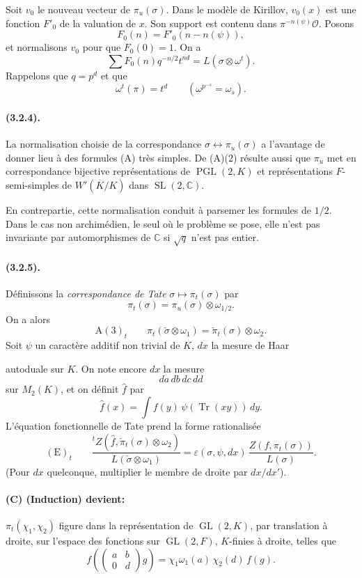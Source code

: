\documentclass[10pt,a4paper]{article}
\providecommand{\GL}{\operatorname{GL}}
\providecommand{\SL}{\operatorname{SL}}
\providecommand{\PGL}{\operatorname{PGL}}
\providecommand{\Tr}{\operatorname{Tr}}
\providecommand{\C}{\mathbb C}
\begin{document}
Soit \(v_0\) le nouveau vecteur de \(\pi_u(\sigma)\). Dans le modèle de Kirillov, \(v_0(x)\) est une fonction \(F'_0\) de la valuation de \(x\). Son support est contenu dans \(\pi^{-n(\psi)}\mathcal O\). Posons
\[
F_0(n)=F'_0(n-n(\psi)),
\]
et normalisons \(v_0\) pour que \(F_0(0)=1\). On a
\[
\sum F_0(n)q^{-n/2}t^{nd}=L(\sigma\otimes\omega^t).
\]
Rappelons que \(q=p^d\) et que
\[
\omega^t(\pi)=t^d\qquad(\omega^{p^{-s}}=\omega_s).
\]

\paragraph{(3.2.4).} La normalisation choisie de la correspondance \(\sigma\longleftrightarrow\pi_u(\sigma)\) a l'avantage de donner lieu à des formules (A) très simples. De (A)(2) résulte aussi que \(\pi_u\) met en correspondance bijective représentations de \(\PGL(2,K)\) et représentations \(F\)-semi-simples de \(W'(\overline K/K)\) dans \(\SL(2,\C)\).

En contrepartie, cette normalisation conduit à parsemer les formules de \(1/2\). Dans le cas non archimédien, le seul où le problème se pose, elle n'est pas invariante par automorphismes de \(\C\) si \(\sqrt q\) n'est pas entier.

\paragraph{(3.2.5).} Définissons la \emph{correspondance de Tate} \(\sigma\longmapsto\pi_t(\sigma)\) par
\[
\pi_t(\sigma)=\pi_u(\sigma)\otimes\omega_{1/2}.
\]
On a alors
\[
\mathrm{A}(3)_t\qquad
\pi_t(\check\sigma\otimes\omega_1)=\check\pi_t(\sigma)\otimes\omega_2.
\]
Soit \(\psi\) un caractère additif non trivial de \(K\), \(dx\) la mesure de Haar

\clearpage
{}
\hypertarget{authority-46}{}
autoduale sur \(K\). On note encore \(dx\) la mesure
\[
da\,db\,dc\,dd
\]
sur \(M_2(K)\), et on définit \(\widehat f\) par
\[
\widehat f(x)=\int f(y)\,\psi(\Tr(xy))\,dy.
\]
L'équation fonctionnelle de Tate prend la forme rationalisée
\[
\mathrm{(E)}_t\qquad
\frac{{}^{t}Z(\widehat f,\check\pi_t(\sigma)\otimes\omega_2)}
     {L(\check\sigma\otimes\omega_1)}
=
\varepsilon(\sigma,\psi,dx)\,
\frac{Z(f,\pi_t(\sigma))}{L(\sigma)}.
\]
(Pour \(dx\) quelconque, multiplier le membre de droite par \(dx/dx'\)).

\paragraph{(C) (Induction) devient:} \(\pi_t(\chi_1,\chi_2)\) figure dans la représentation de \(\GL(2,K)\), par translation à droite, sur l'espace des fonctions sur \(\GL(2,F)\), \(K\)-finies à droite, telles que
\[
\tag{5.2.3.1}
f\!\left(\begin{pmatrix}a&b\\0&d\end{pmatrix}g\right)
=\chi_1\omega_1(a)\,\chi_2(d)\,f(g).
\]
\end{document}
